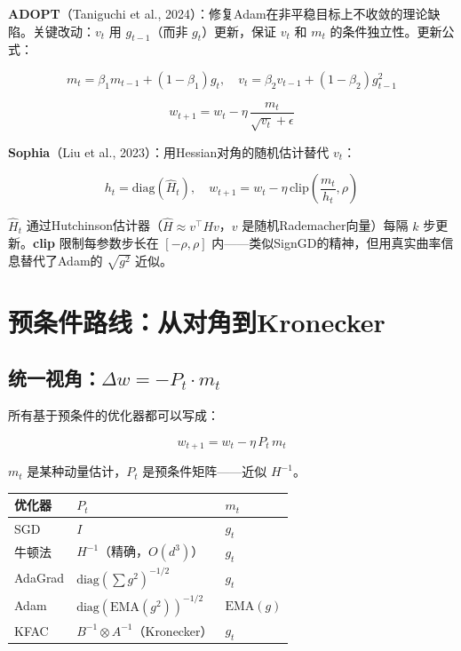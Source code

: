 \documentclass[12pt,a4paper]{article}
\begin{document}
\textbf{ADOPT}（Taniguchi et al., 2024）：修复Adam在非平稳目标上不收敛的理论缺陷。关键改动：$v_t$ 用 $g_{t-1}$（而非 $g_t$）更新，保证 $v_t$ 和 $m_t$ 的条件独立性。更新公式：


\[m_t = \beta_1 m_{t-1} + (1-\beta_1)g_t, \quad v_t = \beta_2 v_{t-1} + (1-\beta_2)g_{t-1}^2\]

\[w_{t+1} = w_t - \eta\,\frac{m_t}{\sqrt{v_t} + \epsilon}\]

\textbf{Sophia}（Liu et al., 2023）：用Hessian对角的随机估计替代 $v_t$：


\[h_t = \text{diag}(\hat{H}_t), \quad w_{t+1} = w_t - \eta\,\text{clip}\!\left(\frac{m_t}{h_t}, \rho\right)\]

$\hat{H}_t$ 通过Hutchinson估计器（$\hat{H} \approx v^\top H v$，$v$ 是随机Rademacher向量）每隔 $k$ 步更新。\textbf{clip} 限制每参数步长在 $[-\rho, \rho]$ 内——类似SignGD的精神，但用真实曲率信息替代了Adam的 $\sqrt{g^2}$ 近似。





\section{预条件路线：从对角到Kronecker}


\subsection{统一视角：$\Delta w = -P_t \cdot m_t$}

所有基于预条件的优化器都可以写成：


\[w_{t+1} = w_t - \eta\,P_t\,m_t\]

$m_t$ 是某种动量估计，$P_t$ 是预条件矩阵——近似 $H^{-1}$。








\begin{center}\small
\begin{longtable}{|l|l|l|}
\hline
优化器 & $P_t$ & $m_t$ \\
\hline
SGD & $I$ & $g_t$ \\
牛顿法 & $H^{-1}$（精确，$O(d^3)$） & $g_t$ \\
AdaGrad & $\text{diag}(\sum g^2)^{-1/2}$ & $g_t$ \\
Adam & $\text{diag}(\text{EMA}(g^2))^{-1/2}$ & $\text{EMA}(g)$ \\
KFAC & $B^{-1} \otimes A^{-1}$（Kronecker） & $g_t$ \\
\hline
\end{longtable}
\end{center}
\end{document}

